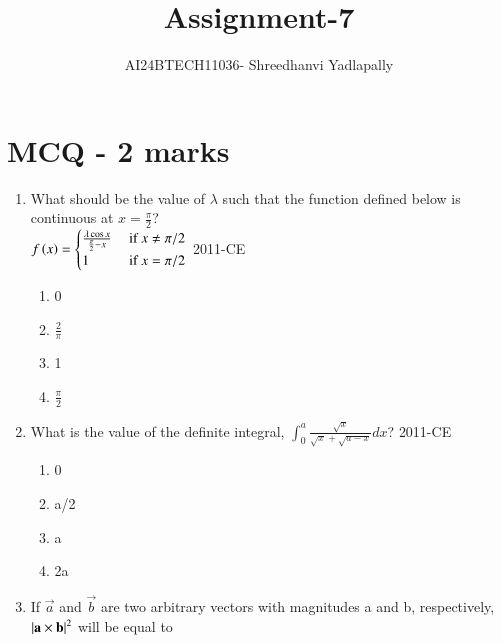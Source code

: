 \documentclass[journal,12pt,onecolumn]{IEEEtran}
\theoremstyle{remark}
\begin{document}

\vspace{3cm}

\title{Assignment-7}
\author{AI24BTECH11036- Shreedhanvi Yadlapally}
\maketitle

\bigskip
\renewcommand{\thefigure}{\theenumi}
\renewcommand{\thetable}{\theenumi}
\section{MCQ - 2 marks}

\begin{enumerate}

\item What should be the value of $\lambda$ such that the function defined below is continuous at $x=\frac{\pi}{2}$?\\
$f\left(x\right)=
\begin{cases}
\frac{\lambda \cos x}{\frac{\pi}{2}-x} & \text{ if } x\neq \pi /2 \\
1 & \text{ if } x=\pi /2 \\
\end{cases}$
		\hfill{2011-CE}
	\begin{multicols}{4}
	\begin{enumerate}
		\item 0
		\item $\frac{2}{\pi}$
		\item 1
		\item $\frac{\pi}{2}$
	\end{enumerate}
	\end{multicols}

\item What is the value of the definite integral, $\int_{0}^{a} \frac{\sqrt{x}}{\sqrt{x}+\sqrt{a-x}} dx$?
	\hfill{2011-CE}

	\begin{multicols}{4}
	\begin{enumerate}
		\item 0
		\item a/2
		\item a
		\item 2a
	\end{enumerate}
	\end{multicols}

\item If $\vec{a}$ and $\vec{b}$ are two arbitrary vectors with magnitudes a and b, respectively, $\left\vert\mathbf{a} \times \mathbf{b}\right\vert^2$ will be equal to


\end{enumerate}
\end{document}

